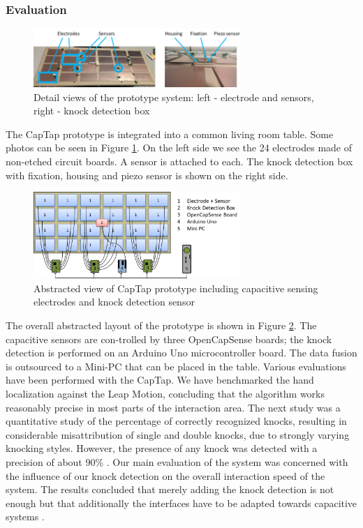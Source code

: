 \subsubsection{Evaluation}
\begin{figure}[h]
\centering
\includegraphics[width=0.7\textwidth]{images/captap_proto}
\caption{Detail views of the prototype system: left - electrode and sensors, right - knock detection box \cite{Braun2013ChairAid}}
\label{fig:captap_proto}
\end{figure}
The CapTap prototype is integrated into a common living room table. Some photos can be seen in Figure \ref{fig:captap_proto}. On the left side we see the 24 electrodes made of non-etched circuit boards. A sensor is attached to each. The knock detection box with fixation, housing and piezo sensor is shown on the right side.
\begin{figure}[h]
\centering
\includegraphics[width=0.7\textwidth]{images/captap_system}
\caption{Abstracted view of CapTap prototype including capacitive sensing electrodes and knock detection sensor \cite{Braun2013ChairAid}}
\label{fig:captap_system}
\end{figure} 
The overall abstracted layout of the prototype is shown in Figure \ref{fig:captap_system}. The capacitive sensors are con-trolled by three OpenCapSense boards; the knock detection is performed on an Arduino Uno microcontroller board. The data fusion is outsourced to a Mini-PC that can be placed in the table.
Various evaluations have been performed with the CapTap. We have benchmarked the hand localization against the Leap Motion, concluding that the algorithm works reasonably precise in most parts of the interaction area. The next study was a quantitative study of the percentage of correctly recognized knocks, resulting in considerable misattribution of single and double knocks, due to strongly varying knocking styles. However, the presence of any knock was detected with a precision of about $90\%$ \cite{Braun2013ChairAid}. Our main evaluation of the system was concerned with the influence of our knock detection on the overall interaction speed of the system. The results concluded that merely adding the knock detection is not enough but that additionally the interfaces have to be adapted towards capacitive systems \cite{Braun2013ChairAid}.
